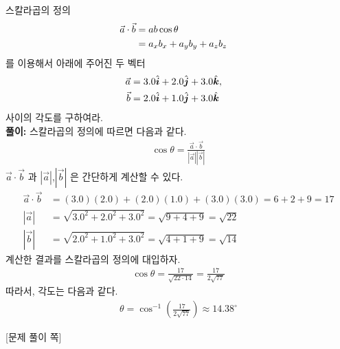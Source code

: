 \documentclass[floatfix,nofootinbib,superscriptaddress,fleqn,preprint]{revtex4-2}
\begin{document}
 스칼라곱의 정의
\begin{align}
\vec{a}\cdot\vec{b} &= ab\cos\theta  \cr
&=a_xb_x + a_yb_y + a_z b_z 
\end{align}
를 이용해서 아래에 주어진 두 벡터
\begin{align}
\vec{a} &= 3.0\hat{\bm{i}} + 2.0\hat{\bm{j}} + 3.0\hat{\bm{k}},\cr
\vec{b} &= 2.0\hat{\bm{i}} + 1.0\hat{\bm{j}} + 3.0\hat{\bm{k}}
\end{align}
사이의 각도를 구하여라. \\
\noindent \textbf{풀이:} 스칼라곱의 정의에 따르면 다음과 같다.
\begin{align}
  \cos\theta=\frac{\vec{a}\cdot\vec{b}}{|\vec{a}||\vec{b}|}
\end{align}
$\vec{a}\cdot\vec{b}$ 과 $|\vec{a}|$,$|\vec{b}|$ 은 간단하게 계산할 수 있다. 
\begin{align*}
  \vec{a}\cdot\vec{b} &= (3.0)(2.0)+(2.0)(1.0)+(3.0)(3.0) = 6+2+9 = 17 \\
  |\vec{a}|&=\sqrt{{3.0}^2+{2.0}^2+{3.0}^2}=\sqrt{9+4+9}=\sqrt{22} \\
  |\vec{b}|&=\sqrt{{2.0}^2+{1.0}^2+{3.0}^2}=\sqrt{4+1+9}=\sqrt{14}
\end{align*}
계산한 결과를 스칼라곱의 정의에 대입하자.
\begin{align*}
  \cos\theta = \frac{17}{\sqrt{22\cdot 14}}=\frac{17}{2\sqrt{77}}
\end{align*}
따라서, 각도는 다음과 같다.
\begin{align*}
  \theta = \cos^{-1}\left(\frac{17}{2\sqrt{77}}\right) \approx 14.38^{\circ}
\end{align*}

\newpage

{\color{gray} [문제 풀이 쪽]}

\newpage 
\end{document}
